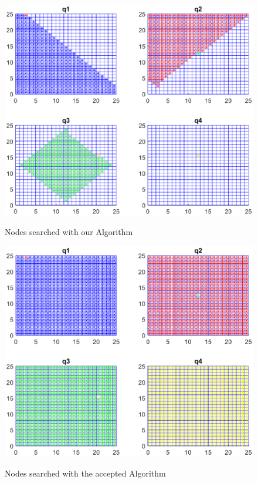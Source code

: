 \begin{figure}[!htb]
\centering
\includegraphics[scale=0.9]{ourPlot}
\label{fig:animOur}
\caption{Nodes searched with our Algorithm}
\end{figure}

\begin{figure}[!htb]
\centering
\includegraphics[scale=0.9]{acceptedPlot}
\label{fig:animAccept}
\caption{Nodes searched with the accepted Algorithm}
\end{figure}

